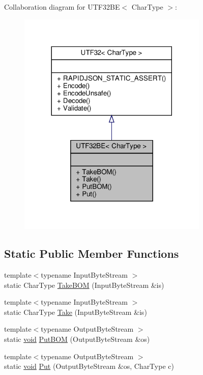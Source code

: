 Collaboration diagram for U\+T\+F32\+BE$<$ Char\+Type $>$\+:
\nopagebreak
\begin{figure}[H]
\begin{center}
\leavevmode
\includegraphics[width=257pt]{structUTF32BE__coll__graph}
\end{center}
\end{figure}
\subsection*{Static Public Member Functions}
\begin{DoxyCompactItemize}
\item 
{\footnotesize template$<$typename Input\+Byte\+Stream $>$ }\\static Char\+Type \hyperlink{structUTF32BE_a07d228f51ad43ef83af2529ca4bd1181}{Take\+B\+OM} (Input\+Byte\+Stream \&is)
\item 
{\footnotesize template$<$typename Input\+Byte\+Stream $>$ }\\static Char\+Type \hyperlink{structUTF32BE_ace3086ece3b13417c758b5abcf3016c8}{Take} (Input\+Byte\+Stream \&is)
\item 
{\footnotesize template$<$typename Output\+Byte\+Stream $>$ }\\static \hyperlink{imgui__impl__opengl3__loader_8h_ac668e7cffd9e2e9cfee428b9b2f34fa7}{void} \hyperlink{structUTF32BE_a8b1a216dd267ff06a9000cbe593ebd24}{Put\+B\+OM} (Output\+Byte\+Stream \&os)
\item 
{\footnotesize template$<$typename Output\+Byte\+Stream $>$ }\\static \hyperlink{imgui__impl__opengl3__loader_8h_ac668e7cffd9e2e9cfee428b9b2f34fa7}{void} \hyperlink{structUTF32BE_ad270b8b016d477f7f7354df535fa28c5}{Put} (Output\+Byte\+Stream \&os, Char\+Type c)
\end{DoxyCompactItemize}
